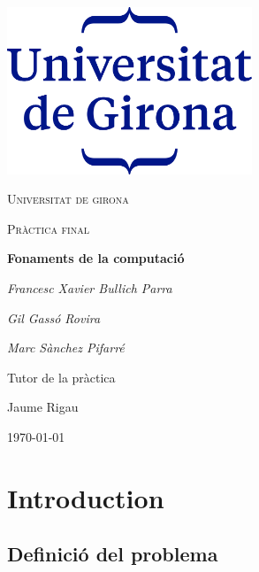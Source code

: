 \documentclass[12pt,a4paper]{report}
\begin{document}
\begin{titlepage}
	\centering
	\includegraphics[width=0.55\textwidth]{udg_logo.png}\par\vspace{1cm}
	{\scshape\LARGE Universitat de girona \par}
	\vspace{1cm}
	{\scshape\Large Pràctica final\par}
	\vspace{1.5cm}
	{\huge\bfseries Fonaments de la computació\par}
	\vspace{2cm}
	{\Large\itshape Francesc Xavier Bullich Parra\par}
	{\Large\itshape Gil Gassó Rovira\par}
	{\Large\itshape Marc Sànchez Pifarré\par}
			
	\vfill
	Tutor de la pràctica\par
	Jaume Rigau

	\vfill

	{\large \today\par}
\end{titlepage}

\tableofcontents
\clearpage


\chapter{Introduction}
\setcounter{chapter}{1}

\section{Definició del problema}
\end{document}
